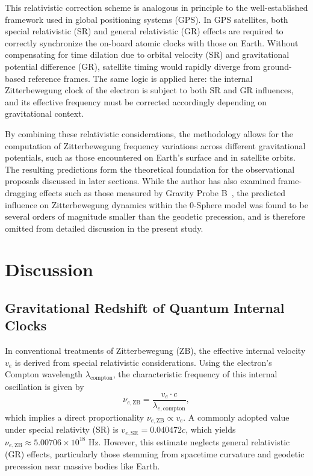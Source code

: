 \documentclass[%
 reprint,
 amsmath,amssymb,
 aps,
]{revtex4-1}
\numberwithin{equation}{section}%
\begin{document}
This relativistic correction scheme is analogous in principle to the well-established framework used in global positioning systems (GPS). In GPS satellites, both special relativistic (SR) and general relativistic (GR) effects are required to correctly synchronize the on-board atomic clocks with those on Earth. Without compensating for time dilation due to orbital velocity (SR) and gravitational potential difference (GR), satellite timing would rapidly diverge from ground-based reference frames. The same logic is applied here: the internal Zitterbewegung clock of the electron is subject to both SR and GR influences, and its effective frequency must be corrected accordingly depending on gravitational context.

By combining these relativistic considerations, the methodology allows for the computation of Zitterbewegung frequency variations across different gravitational potentials, such as those encountered on Earth's surface and in satellite orbits. The resulting predictions form the theoretical foundation for the observational proposals discussed in later sections. While the author has also examined frame-dragging effects such as those measured by Gravity Probe B~\cite{everitt2011}, the predicted influence on Zitterbewegung dynamics within the 0-Sphere model was found to be several orders of magnitude smaller than the geodetic precession, and is therefore omitted from detailed discussion in the present study.


\section{Discussion}

\subsection{Gravitational Redshift of Quantum Internal Clocks}

In conventional treatments of Zitterbewegung (ZB), the effective internal velocity $v_e$ is derived from special relativistic considerations. Using the electron's Compton wavelength $\lambda_{\mathrm{compton}}$, the characteristic frequency of this internal oscillation is given by
\begin{equation}
\nu_{e,\text{ZB}} = \frac{v_e \cdot c}{\lambda_{e, \mathrm{compton}}},
\label{eq:nu_from_ve}
\end{equation}
which implies a direct proportionality $\nu_{e,\text{ZB}} \propto v_e$. A commonly adopted value under special relativity (SR) is $v_{e,\text{SR}} = 0.040472c$, which yields $\nu_{e,\text{ZB}} \approx 5.00706 \times 10^{18}$ Hz. However, this estimate neglects general relativistic (GR) effects, particularly those stemming from spacetime curvature and geodetic precession near massive bodies like Earth.
\end{document}
